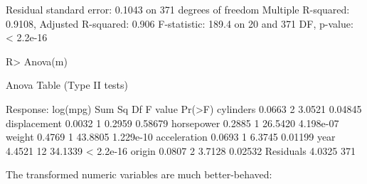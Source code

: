 \documentclass[
]{jss}
\begin{document}
\begin{CodeChunk}
\begin{CodeOutput}
Residual standard error: 0.1043 on 371 degrees of freedom
Multiple R-squared:  0.9108,    Adjusted R-squared:  0.906 
F-statistic: 189.4 on 20 and 371 DF,  p-value: < 2.2e-16
\end{CodeOutput}
\begin{CodeInput}
R> Anova(m)
\end{CodeInput}
\begin{CodeOutput}
Anova Table (Type II tests)

Response: log(mpg)
             Sum Sq  Df F value    Pr(>F)
cylinders    0.0663   2  3.0521   0.04845
displacement 0.0032   1  0.2959   0.58679
horsepower   0.2885   1 26.5420 4.198e-07
weight       0.4769   1 43.8805 1.229e-10
acceleration 0.0693   1  6.3745   0.01199
year         4.4521  12 34.1339 < 2.2e-16
origin       0.0807   2  3.7128   0.02532
Residuals    4.0325 371                  
\end{CodeOutput}
\end{CodeChunk}

The transformed numeric variables are much better-behaved:
\end{document}
